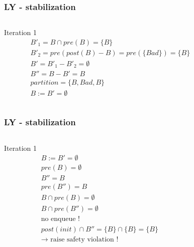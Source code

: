 \documentclass[11pt,handout]{beamer}
\begin{document}
\begin{frame}[fragile]
  \frametitle{LY - stabilization}
  \begin{columns}
    \begin{column}{0.5\textwidth}
      Iteration 1
      \begin{align*}
        & B'_1 = B \cap pre(B) = \{B\} \\
        & B'_2 = pre(post(B) - B) = pre(\{ Bad \}) = \{B\} \\
        & B' = B'_1 - B'_2 = \emptyset \\
        & B'' = B - B' = B \\
        & partition = \{B, Bad, B\} \\
        & B := B' = \emptyset
      \end{align*}
    \end{column}
    \begin{column}{0.5\textwidth}%
      
    \end{column}
  \end{columns}
\end{frame}

\begin{frame}[fragile]
  \frametitle{LY - stabilization}
  \begin{columns}
    \begin{column}{0.5\textwidth}
      Iteration 1
      \begin{align*}
        & B := B' = \emptyset \\
        & pre(B) = \emptyset \\
        & B'' = B \\
        & pre(B'') = B \\
        & B \cap pre(B) = \emptyset \\
        & B \cap pre(B'') = \emptyset \\
        & \text{no enqueue !} \\
        & post(init) \cap B'' = \{B\} \cap \{B\} = \{B\}\\
        & \to \text{ raise safety violation !}
      \end{align*}
    \end{column}
    \begin{column}{0.5\textwidth}%
      
    \end{column}
  \end{columns}
\end{frame}

\end{document}
